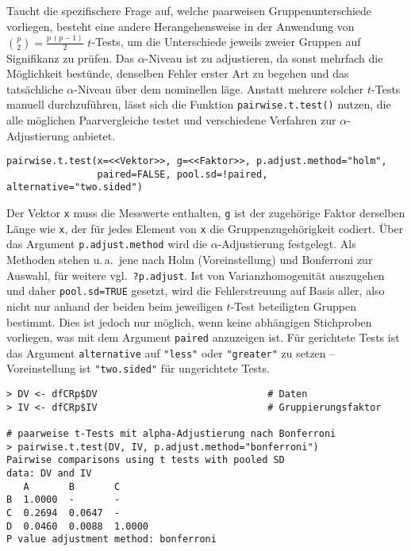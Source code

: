 Taucht die spezifischere Frage auf, welche paarweisen Gruppenunterschiede vorliegen, besteht eine andere Herangehensweise in der Anwendung von ${p \choose 2} = \frac{p \, (p-1)}{2}$ $t$-Tests, um die Unterschiede jeweils zweier Gruppen auf Signifikanz zu prüfen. Das $\alpha$-Niveau ist zu adjustieren, da sonst mehrfach die Möglichkeit bestünde, denselben Fehler erster Art zu begehen und das tatsächliche $\alpha$-Niveau über dem nominellen läge. Anstatt mehrere solcher $t$-Tests manuell durchzuführen, lässt sich die Funktion \lstinline!pairwise.t.test()! nutzen, die alle möglichen Paarvergleiche testet und verschiedene Verfahren zur $\alpha$-Adjustierung anbietet.
\begin{lstlisting}
pairwise.t.test(x=<<Vektor>>, g=<<Faktor>>, p.adjust.method="holm",
                paired=FALSE, pool.sd=!paired, alternative="two.sided")
\end{lstlisting}

Der Vektor \lstinline!x! muss die Messwerte enthalten, \lstinline!g! ist der zugehörige Faktor derselben Länge wie \lstinline!x!, der für jedes Element von \lstinline!x! die Gruppenzugehörigkeit codiert. Über das Argument \lstinline!p.adjust.method! wird die $\alpha$-Adjustierung festgelegt. Als Methoden stehen u.\,a.\ jene nach Holm (Voreinstellung) und Bonferroni zur Auswahl, für weitere vgl.\ \lstinline!?p.adjust!. Ist von Varianzhomogenität auszugehen und daher \lstinline!pool.sd=TRUE! gesetzt, wird die Fehlerstreuung auf Basis aller, also nicht nur anhand der beiden beim jeweiligen $t$-Test beteiligten Gruppen bestimmt. Dies ist jedoch nur möglich, wenn keine abhängigen Stichproben vorliegen, was mit dem Argument \lstinline!paired! anzuzeigen ist. Für gerichtete Tests ist das Argument \lstinline!alternative! auf \lstinline!"less"! oder \lstinline!"greater"! zu setzen -- Voreinstellung ist \lstinline!"two.sided"! für ungerichtete Tests.
\begin{lstlisting}
> DV <- dfCRp$DV                              # Daten
> IV <- dfCRp$IV                              # Gruppierungsfaktor

# paarweise t-Tests mit alpha-Adjustierung nach Bonferroni
> pairwise.t.test(DV, IV, p.adjust.method="bonferroni")
Pairwise comparisons using t tests with pooled SD
data: DV and IV
   A       B       C
B  1.0000  -       -
C  0.2694  0.0647  -
D  0.0460  0.0088  1.0000
P value adjustment method: bonferroni
\end{lstlisting}


